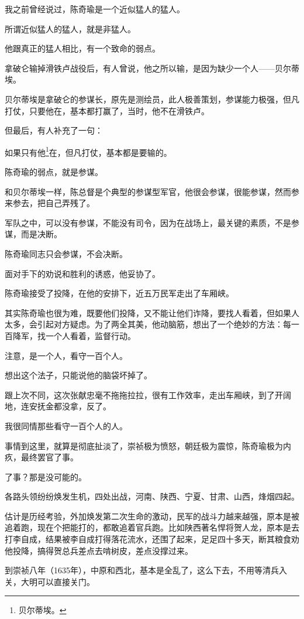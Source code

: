 \begin{multicols}{\theparacolNo}
		我之前曾经说过，陈奇瑜是一个近似猛人的猛人。

		所谓近似猛人的猛人，就是非猛人。

		他跟真正的猛人相比，有一个致命的弱点。

		拿破仑输掉滑铁卢战役后，有人曾说，他之所以输，是因为缺少一个人——贝尔蒂埃。

		贝尔蒂埃是拿破仑的参谋长，原先是测绘员，此人极善策划，参谋能力极强，但凡打仗，只要他在，基本都打赢了，当时，他不在滑铁卢。

		但最后，有人补充了一句：

		如果只有他\footnote{贝尔蒂埃。}在，但凡打仗，基本都是要输的。

		陈奇瑜的弱点，就是参谋。

		和贝尔蒂埃一样，陈总督是个典型的参谋型军官，他很会参谋，很能参谋，然而参来参去，把自己弄残了。

		军队之中，可以没有参谋，不能没有司令，因为在战场上，最关键的素质，不是参谋，而是决断。

		陈奇瑜同志只会参谋，不会决断。

		面对手下的劝说和胜利的诱惑，他妥协了。

		陈奇瑜接受了投降，在他的安排下，近五万民军走出了车厢峡。

		其实陈奇瑜也很为难，既要他们投降，又不能让他们诈降，要找人看着，但如果人太多，会引起对方疑虑。为了两全其美，他动脑筋，想出了一个绝妙的方法：每一百降军，找一个人看着，监督行动。

		注意，是一个人，看守一百个人。

		想出这个法子，只能说他的脑袋坏掉了。

		跟上次不同，这次张献忠毫不拖拖拉拉，很有工作效率，走出车厢峡，到了开阔地，连安抚金都没拿，反了。

		我很同情那些看守一百个人的人。

		事情到这里，就算是彻底扯淡了，崇祯极为愤怒，朝廷极为震惊，陈奇瑜极为内疚，最终罢官了事。

		了事？那是没可能的。

		各路头领纷纷焕发生机，四处出战，河南、陕西、宁夏、甘肃、山西，烽烟四起。

		估计是历经考验，外加焕发第二次生命的激动，民军的战斗力越来越强，原本是被追着跑，现在个把能打的，都敢追着官兵跑。比如陕西著名悍将贺人龙，原本是去打李自成，结果被李自成打得落花流水，还围了起来，足足四十多天，断其粮食劝他投降，搞得贺总兵差点去啃树皮，差点没撑过来。

		到崇祯八年（1635年），中原和西北，基本是全乱了，这么下去，不用等清兵入关，大明可以直接关门。


\end{multicols}
